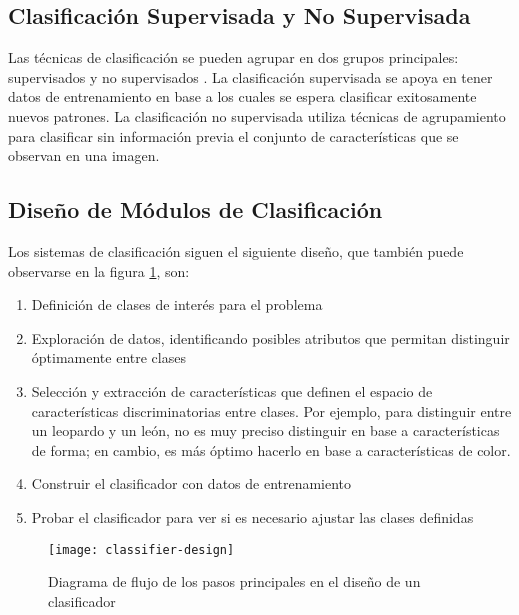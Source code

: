 \subsection{Clasificación Supervisada y No Supervisada}
Las técnicas de clasificación se pueden agrupar en dos grupos principales: supervisados y no supervisados \cite{Solomon2011-xz}. 
La clasificación supervisada se apoya en tener datos de entrenamiento en base a los cuales se espera clasificar exitosamente nuevos patrones.
La clasificación no supervisada utiliza técnicas de agrupamiento para clasificar sin información previa el conjunto de características que se observan en una imagen. 

\subsection{Diseño de Módulos de Clasificación }

Los sistemas de clasificación siguen el siguiente diseño, que también puede observarse en la figura \ref{fig:classifier-design}, son: 
\begin{enumerate}
    \item Definición de clases de interés para el problema
\item Exploración de datos, identificando posibles atributos que permitan distinguir óptimamente entre clases
\item Selección y extracción de características que definen el espacio de características discriminatorias entre clases. Por ejemplo, para distinguir entre un leopardo y un león, no es muy preciso distinguir en base a características de forma; en cambio, es más óptimo hacerlo en base a características de color.
\item Construir el clasificador con datos de entrenamiento
\item Probar el clasificador para ver si es necesario ajustar las clases definidas
\end{enumerate}

    \begin{figure}[H]
        \centering
        \texttt{[image: classifier-design]}
        \caption{Diagrama de flujo de los pasos principales en el diseño de un clasificador \protect\cite{Solomon2011-xz}}
        \label{fig:classifier-design}
    \end{figure}
    

